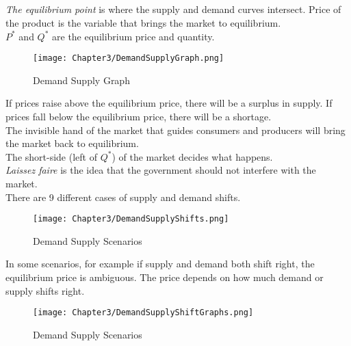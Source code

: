 \subsection{}

\begin{definition}
    \emph{The equilibrium point} is where the supply and demand curves intersect.
    Price of the product is the variable that brings the market to equilibrium.\\
    $P^*$ and $Q^*$ are the equilibrium price and quantity.\\
\end{definition}
\begin{figure}[h!]
    \centering
    \texttt{[image: Chapter3/DemandSupplyGraph.png]}
    \caption{Demand Supply Graph}
\end{figure}
If prices raise above the equilibrium price, there will be a surplus in supply. If prices fall below the equilibrium price, there will be a shortage.\\
The invisible hand of the market that guides consumers and producers will bring the market back to equilibrium.\\
The short-side (left of $Q^*$) of the market decides what happens.\\
\emph{Laissez faire} is the idea that the government should not interfere with the market.\\
There are 9 different cases of supply and demand shifts.\\
\begin{figure}
    \centering
    \texttt{[image: Chapter3/DemandSupplyShifts.png]}
    \caption{Demand Supply Scenarios}
\end{figure}
In some scenarios, for example if supply and demand both shift right, the equilibrium price is ambiguous.
The price depends on how much demand or supply shifts right.\\
\begin{figure}
    \centering
    \texttt{[image: Chapter3/DemandSupplyShiftGraphs.png]}
    \caption{Demand Supply Scenarios}
\end{figure}